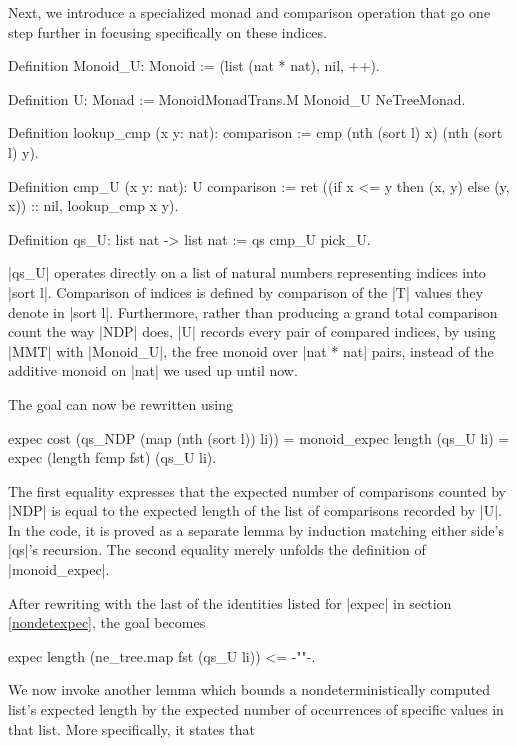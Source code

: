 \documentclass[runningheads]{llncs}
\begin{document}
Next, we introduce a specialized monad and comparison operation that go one step further in focusing specifically on these indices.
\begin{code}
  Definition Monoid_U: Monoid := (list (nat * nat), nil, ++).

  Definition U: Monad := MonoidMonadTrans.M Monoid_U NeTreeMonad.

  Definition lookup_cmp (x y: nat): comparison :=
    cmp (nth (sort l) x) (nth (sort l) y).

  Definition cmp_U (x y: nat): U comparison :=
    ret ((if x <= y then (x, y) else (y, x)) :: nil, lookup_cmp x y).

  Definition qs_U: list nat -> list nat := qs cmp_U pick_U.
\end{code}
|qs_U| operates directly on a list of natural numbers representing indices into |sort l|. Comparison of indices is defined by comparison of the |T| values they denote in |sort l|. Furthermore, rather than producing a grand total comparison count the way |NDP| does, |U| records every pair of compared indices, by using |MMT| with |Monoid_U|, the free monoid over |nat * nat| pairs, instead of the additive monoid on |nat| we used up until now.

The goal can now be rewritten using
\begin{code}expec cost (qs_NDP (map (nth (sort l)) li))
  = monoid_expec length (qs_U li) = expec (length fcmp fst) (qs_U li).
\end{code}
The first equality expresses that the expected number of comparisons counted by |NDP| is equal to the expected length of the list of comparisons recorded by |U|. In the code, it is proved as a separate lemma by induction matching either side's |qs|'s recursion. The second equality merely unfolds the definition of |monoid_expec|.

After rewriting with the last of the identities listed for |expec| in section \ref{nondetexpec}, the goal becomes
\begin{code}
  expec length (ne_tree.map fst (qs_U li)) <= {-""-}.
\end{code}
We now invoke another lemma which bounds a nondeterministically computed list's expected length by the expected number of occurrences of specific values in that list. More specifically, it states that
\end{document}
